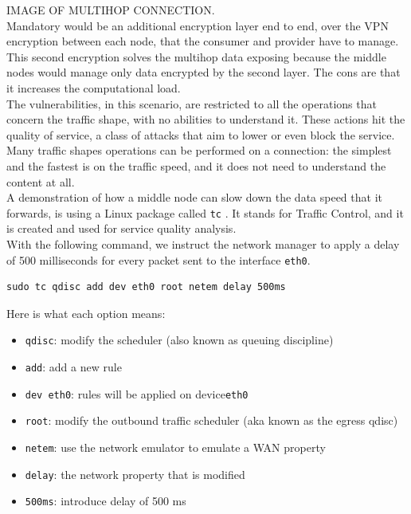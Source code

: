 \documentclass[12pt]{article}
\begin{document}
	IMAGE OF MULTIHOP CONNECTION.\\

	Mandatory would be an additional encryption layer end to end, over the VPN encryption between each node, that the consumer and provider have to manage. This second encryption solves the multihop data exposing because the middle nodes would manage only data encrypted by the second layer. The cons are that it increases the computational load.\\
	The vulnerabilities, in this scenario, are restricted to all the operations that concern the traffic shape, with no abilities to understand it. These actions hit the quality of service, a class of attacks that aim to lower or even block the service.\\
	Many traffic shapes operations can be performed on a connection: the simplest and the fastest is on the traffic speed, and it does not need to understand the content at all.\\
	\bigbreak
	A demonstration of how a middle node can slow down the data speed that it forwards, is using a Linux package called \lstinline{tc} \cite{tc}. It stands for Traffic Control, and it is created and used for service quality analysis.\\
	With the following command, we instruct the network manager to apply a delay of 500 milliseconds for every packet sent to the interface \lstinline{eth0}.\\
	
	\begin{lstlisting}[frame=single]
		sudo tc qdisc add dev eth0 root netem delay 500ms
	\end{lstlisting}
	
	Here is what each option means:
	\begin{itemize}
		\item \lstinline{qdisc}: modify the scheduler (also known as queuing discipline)
		\item \lstinline{add}: add a new rule
		\item \lstinline{dev eth0}: rules will be applied on device\lstinline{eth0}
		\item \lstinline{root}: modify the outbound traffic scheduler (aka known as the egress qdisc)
		\item \lstinline{netem}: use the network emulator to emulate a WAN property
		\item \lstinline{delay}: the network property that is modified
		\item \lstinline{500ms}: introduce delay of 500 ms
	\end{itemize}
\end{document}

